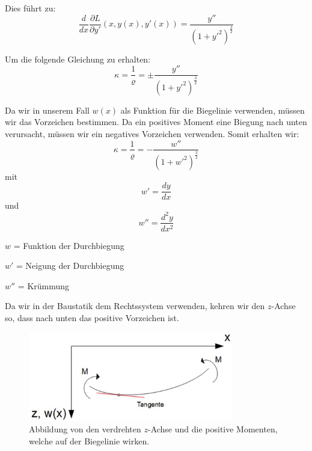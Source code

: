 Dies führt zu:
\begin{equation}
	\frac{d}{dx} \frac{\partial L}{\partial y'}(x,y(x),y'(x)) = \frac{y''}{(1 + {y'}^2)^{\frac{3}{2}}}
\end{equation}

Um die folgende Gleichung zu erhalten:
\begin{equation}
	\kappa = \frac{1}{\varrho} = \pm \frac{y''}{(1 + {y'}^2)^{\frac{3}{2}}}
\end{equation}

Da wir in unserem Fall $w(x)$ als Funktion für die Biegelinie verwenden, müssen wir das Vorzeichen bestimmen. Da ein positives Moment eine Biegung nach unten verursacht, müssen wir ein negatives Vorzeichen verwenden. Somit erhalten wir:
\begin{equation}
	\kappa=
	\frac{1}{\varrho}=
	-\frac{w''}{\left(1+{w'}^2\right)^\frac{3}{2}}
\end{equation}
mit
\begin{equation}
	w'=
	\frac{dy}{dx} 
\end{equation}
und
\begin{equation}
	w''=
	\frac{d^2y}{dx^2}
\end{equation}

$w$ = Funktion der Durchbiegung

$w'$ = Neigung der Durchbiegung

$w''$ = Krümmung

Da wir in der Baustatik dem Rechtssystem verwenden, kehren wir den $z$-Achse so, dass nach unten das positive Vorzeichen ist.
\begin{figure}
\centering
	\includegraphics[width=0.8\textwidth]{papers/balken/images/teil2/BiegungverdrehteAchsen.jpg}
\caption{Abbildung von den verdrehten $z$-Achse und die positive Momenten, welche auf der Biegelinie wirken.}
\label{fig:Abbildung von den verdrehten $z$-Achse und die positive Momenten, welche auf der Biegelinie wirken.}
\end{figure}

